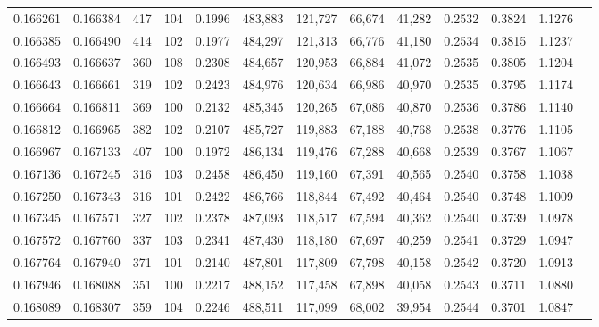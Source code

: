 \begin{tabular}{rrrrrrrrrrrrr}
0.166261 & 0.166384 &   417 & 104 &                                     0.1996 & 483,883 & 121,727 &  66,674 &  41,282 & 0.2532 & 0.3824 & 1.1276 \\
0.166385 & 0.166490 &   414 & 102 &                                     0.1977 & 484,297 & 121,313 &  66,776 &  41,180 & 0.2534 & 0.3815 & 1.1237 \\
0.166493 & 0.166637 &   360 & 108 &                                     0.2308 & 484,657 & 120,953 &  66,884 &  41,072 & 0.2535 & 0.3805 & 1.1204 \\
0.166643 & 0.166661 &   319 & 102 &                                     0.2423 & 484,976 & 120,634 &  66,986 &  40,970 & 0.2535 & 0.3795 & 1.1174 \\
0.166664 & 0.166811 &   369 & 100 &                                     0.2132 & 485,345 & 120,265 &  67,086 &  40,870 & 0.2536 & 0.3786 & 1.1140 \\
0.166812 & 0.166965 &   382 & 102 &                                     0.2107 & 485,727 & 119,883 &  67,188 &  40,768 & 0.2538 & 0.3776 & 1.1105 \\
0.166967 & 0.167133 &   407 & 100 &                                     0.1972 & 486,134 & 119,476 &  67,288 &  40,668 & 0.2539 & 0.3767 & 1.1067 \\
0.167136 & 0.167245 &   316 & 103 &                                     0.2458 & 486,450 & 119,160 &  67,391 &  40,565 & 0.2540 & 0.3758 & 1.1038 \\
0.167250 & 0.167343 &   316 & 101 &                                     0.2422 & 486,766 & 118,844 &  67,492 &  40,464 & 0.2540 & 0.3748 & 1.1009 \\
0.167345 & 0.167571 &   327 & 102 &                                     0.2378 & 487,093 & 118,517 &  67,594 &  40,362 & 0.2540 & 0.3739 & 1.0978 \\
0.167572 & 0.167760 &   337 & 103 &                                     0.2341 & 487,430 & 118,180 &  67,697 &  40,259 & 0.2541 & 0.3729 & 1.0947 \\
0.167764 & 0.167940 &   371 & 101 &                                     0.2140 & 487,801 & 117,809 &  67,798 &  40,158 & 0.2542 & 0.3720 & 1.0913 \\
0.167946 & 0.168088 &   351 & 100 &                                     0.2217 & 488,152 & 117,458 &  67,898 &  40,058 & 0.2543 & 0.3711 & 1.0880 \\
0.168089 & 0.168307 &   359 & 104 &                                     0.2246 & 488,511 & 117,099 &  68,002 &  39,954 & 0.2544 & 0.3701 & 1.0847 \\

\end{tabular}
